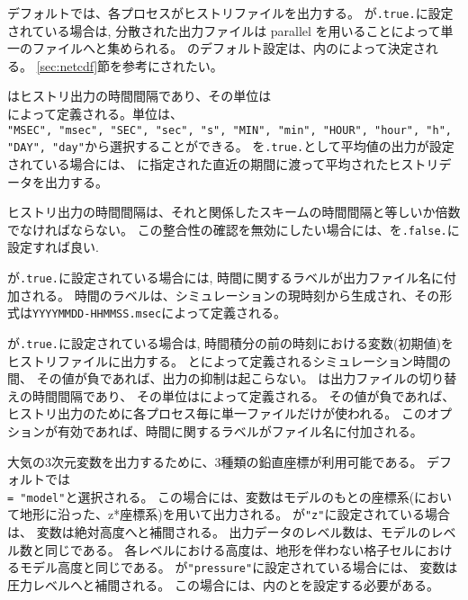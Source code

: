 デフォルトでは、各プロセスがヒストリファイルを出力する。
が\verb|.true.|に設定されている場合は, 
分散された出力ファイルは parallel \Netcdf を用いることによって単一のファイルへと集められる。
のデフォルト設定は、内のによって決定される。
\ref{sec:netcdf}節を参考にされたい。

はヒストリ出力の時間間隔であり、その単位は\\
によって定義される。単位は、\\
\verb|"MSEC", "msec", "SEC", "sec", "s", "MIN", "min", "HOUR", "hour", "h", "DAY", "day"|から選択することができる。
%
を\verb|.true.|として平均値の出力が設定されている場合には、
に指定された直近の期間に渡って平均されたヒストリデータを出力する。

ヒストリ出力の時間間隔は、それと関係したスキームの時間間隔と等しいか倍数でなければならない。
この整合性の確認を無効にしたい場合には、を\verb|.false.|に設定すれば良い.

が\verb|.true.|に設定されている場合には, 
時間に関するラベルが出力ファイル名に付加される。
時間のラベルは、シミュレーションの現時刻から生成され、その形式は\verb|YYYYMMDD-HHMMSS.msec|によって定義される。

が\verb|.true.|に設定されている場合は, 
時間積分の前の時刻における変数(初期値)をヒストリファイルに出力する。
とによって定義されるシミュレーション時間の間、
その値が負であれば、出力の抑制は起こらない。
は出力ファイルの切り替えの時間間隔であり、
その単位はによって定義される。
その値が負であれば、ヒストリ出力のために各プロセス毎に単一ファイルだけが使われる。
このオプションが有効であれば、時間に関するラベルがファイル名に付加される。

大気の3次元変数を出力するために、3種類の鉛直座標が利用可能である。
デフォルトでは\\
 \verb|= "model"|と選択される。
この場合には、変数はモデルのもとの座標系({\scalerm}において地形に沿った、z*座標系)を用いて出力される。
が\verb|"z"|に設定されている場合は、 変数は絶対高度へと補間される。
出力データのレベル数は、モデルのレベル数と同じである。
各レベルにおける高度は、地形を伴わない格子セルにおけるモデル高度と同じである。
が\verb|"pressure"|に設定されている場合には、
変数は圧力レベルへと補間される。
この場合には、内のとを設定する必要がある。

